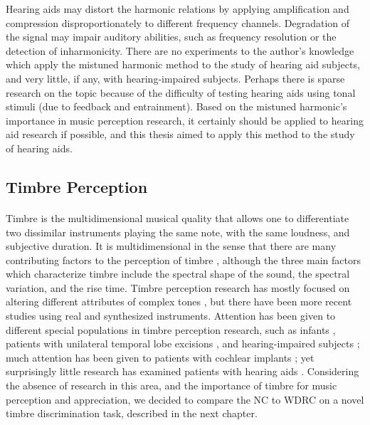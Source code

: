 Hearing aids may distort the harmonic relations by applying amplification and compression disproportionately to different frequency channels.  Degradation of the signal may impair auditory abilities, such as frequency resolution or the detection of inharmonicity.  There are no experiments to the author's knowledge which apply the mistuned harmonic method to the study of hearing aid subjects, and very little, if any, with hearing-impaired subjects.  Perhaps there is sparse research on the topic because of the difficulty of testing hearing aids using tonal stimuli (due to feedback and entrainment).  Based on the mistuned harmonic's importance in music perception research, it certainly should be applied to hearing aid research if possible, and this thesis aimed to apply this method to the study of hearing aids.

\subsection{Timbre Perception}
\paragraph{}Timbre is the multidimensional musical quality that allows one to differentiate two dissimilar instruments playing the same note, with the same loudness, and subjective duration.  It is multidimensional in the sense that there are many contributing factors to the perception of timbre \cite{Grey1977, McAdams1995}, although the three main factors which characterize timbre include the spectral shape of the sound, the spectral variation, and the rise time.  Timbre perception research has mostly focused on altering different attributes of complex tones \cite{Plomp1969, Samson1994}, but there have been more recent studies using real \cite{Emiroglu2008} and synthesized \cite{Rahne2011} instruments.  Attention has been given to different special populations in timbre perception research, such as infants \cite{Clarkson1988, Trehub1990}, patients with unilateral temporal lobe excisions \cite{Samson1994, Samson2002}, and hearing-impaired subjects \cite{Emiroglu2008}; much attention has been given to patients with cochlear implants \cite{Gfeller1991, Gfeller2002, McDermott2004}; yet surprisingly little research has examined patients with hearing aids \cite{Looi2008}.  Considering the absence of research in this area, and the importance of timbre for music perception and appreciation, we decided to compare the NC to WDRC on a novel timbre discrimination task, described in the next chapter.

